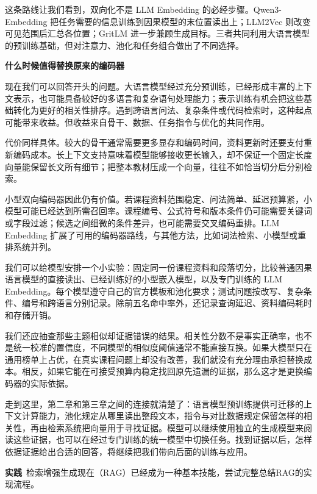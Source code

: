 这条路线让我们看到，双向化不是 LLM Embedding 的必经步骤。Qwen3-Embedding 把任务需要的信息训练到因果模型的末位置读出上；LLM2Vec 则改变可见范围后汇总各位置；GritLM 进一步兼顾生成目标。三者共同利用大语言模型的预训练基础，但对注意力、池化和任务组合做出了不同选择。

\textbf{什么时候值得替换原来的编码器}

现在我们可以回答开头的问题。大语言模型经过充分预训练，已经形成丰富的上下文表示，也可能具备较好的多语言和复杂语句处理能力；表示训练有机会把这些基础转化为更好的相关性排序。遇到跨语言问法、复杂条件或代码检索时，这种起点可能带来收益。但收益来自骨干、数据、任务指令与优化的共同作用。

代价同样具体。较大的骨干通常需要更多显存和编码时间，资料更新时还要支付重新编码成本。长上下文支持意味着模型能够接收更长输入，却不保证一个固定长度向量能保留长文所有细节；把整本教材压成一个向量，往往不如恰当切分后分别检索。

小型双向编码器因此仍有价值。若课程资料范围稳定、问法简单、延迟预算紧，小模型可能已经达到所需召回率。课程编号、公式符号和版本条件仍可能需要关键词或字段过滤；候选之间细微的条件差异，也可能需要交叉编码重排。LLM Embedding 扩展了可用的编码器路线，与其他方法，比如词法检索、小模型或重排系统并列。

我们可以给模型安排一个小实验：固定同一份课程资料和段落切分，比较普通因果语言模型的直接读出、已经训练好的小型嵌入模型，以及专门训练的 LLM Embedding。每个模型遵守自己的官方模板和池化要求；测试问题按改写、复杂条件、编号和跨语言分别记录。除前五名命中率外，还记录查询延迟、资料编码耗时和存储开销。

我们还应抽查那些主题相似却证据错误的结果。相关性分数不是事实正确率，也不是统一校准的置信度，不同模型的相似度阈值通常不能直接互换。如果大模型只在通用榜单上占优，在真实课程问题上却没有改善，我们就没有充分理由承担替换成本。相反，如果它能在可接受预算内稳定找回原先遗漏的证据，那么这才是更换编码器的实际依据。

走到这里，第二章和第三章之间的连接就清楚了：语言模型预训练提供可迁移的上下文计算能力，池化规定从哪里读出整段文本，指令与对比数据规定保留怎样的相关性，再由检索系统把向量用于寻找证据。模型可以继续使用独立的生成模型来阅读这些证据，也可以在经过专门训练的统一模型中切换任务。找到证据以后，怎样依据证据给出合适的回答，将继续把我们带向后面的训练与应用。

\textbf{实践}~检索增强生成现在（RAG）已经成为一种基本技能，尝试完整总结RAG的实现流程。

